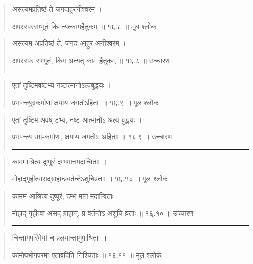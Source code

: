\begin{quotation}

असत्यमप्रतिष्ठं ते जगदाहुरनीश्वरम्‌ ।  

अपरस्परसम्भूतं किमन्यत्कामहैतुकम्‌  ॥ १६.८ ॥  मूल श्लोक
\end{quotation}

\begin{quotation}

असत्यम अप्रतिष्ठं ते, जगद आहुर अनीश्वरम्‌ ।  

अपरस्पर सम्भूतं, किम अन्यत् काम हैतुकम्‌  ॥ १६.८ ॥  उच्चारण

\noindent\rule{16cm}{0.4pt} 
\end{quotation}


\begin{quotation}

एतां दृष्टिमवष्टभ्य नष्टात्मानोऽल्पबुद्धयः ।  

प्रभवन्त्युग्रकर्माणः क्षयाय जगतोऽहिताः  ॥ १६.९ ॥  मूल श्लोक
\end{quotation}

\begin{quotation}

एतां दृष्टिम अवष्-टभ्य, नष्ट आत्मानोऽ अल्प बुद्धयः ।  

प्रभवन्त्य उग्र-कर्माणः, क्षयाय जगतोऽ अहिताः  ॥ १६.९ ॥  उच्चारण

\noindent\rule{16cm}{0.4pt} 
\end{quotation}


\begin{quotation}

काममाश्रित्य दुष्पूरं दम्भमानमदान्विताः ।  

मोहाद्‍गृहीत्वासद्ग्राहान्प्रवर्तन्तेऽशुचिव्रताः  ॥ १६.१० ॥  मूल श्लोक
\end{quotation}

\begin{quotation}

कामम आश्रित्य दुष्पूरं, दम्भ मान मदान्विताः ।  

मोहाद्‍ गृहीत्वा-असद्-ग्राहान्, प्र-वर्तन्तेऽ अशुचि व्रताः  ॥ १६.१० ॥  उच्चारण

\noindent\rule{16cm}{0.4pt} 
\end{quotation}


\begin{quotation}

चिन्तामपरिमेयां च प्रलयान्तामुपाश्रिताः ।  

कामोपभोगपरमा एतावदिति निश्चिताः  ॥ १६.११ ॥  मूल श्लोक
\end{quotation}

